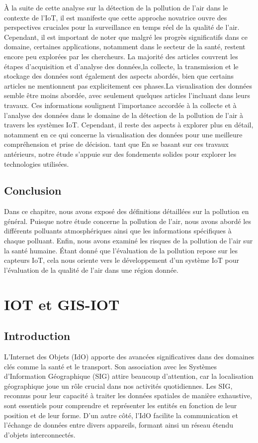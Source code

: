 \documentclass{report}
\begin{document}
À la suite de cette analyse sur la détection de la pollution de l'air dans le contexte de l'IoT, il est manifeste que cette approche novatrice ouvre des perspectives cruciales pour la surveillance en temps réel de la qualité de l'air. Cependant, il est important de noter que malgré les progrès significatifs dans ce domaine, certaines applications, notamment dans le secteur de la santé, restent encore peu explorées par les chercheurs.
La majorité des articles couvrent les étapes d'acquisition et d'analyse des données,la collecte, la transmission et le stockage des données sont également des aspects abordés, bien que certains articles ne mentionnent pas explicitement ces phases.La visualisation des données semble être moins abordée, avec seulement quelques articles l'incluant dans leurs travaux.
Ces informations soulignent l'importance accordée à la collecte et à l'analyse des données dans le domaine de la détection de la pollution de l'air à travers les systèmes IoT. Cependant, il reste des aspects à explorer plus en détail, notamment en ce qui concerne la visualisation des données pour une meilleure compréhension et prise de décision.
tant que 
En se basant sur ces travaux antérieurs, notre étude s'appuie sur des fondements solides pour explorer les technologies utilisées.

\section{Conclusion}
Dans ce chapitre, nous avons exposé des définitions détaillées sur la pollution en général. Puisque notre étude concerne la pollution de l'air, nous avons abordé les différents polluants atmosphériques ainsi que les informations spécifiques à chaque polluant. Enfin, nous avons examiné les risques de la pollution de l'air sur la santé humaine. Étant donné que l'évaluation de la pollution repose sur les capteurs IoT, cela nous oriente vers le développement d'un système IoT pour l'évaluation de la qualité de l'air dans une région donnée. 


\chapter{IOT et GIS-IOT}
\newpage
\section{Introduction}
L'Internet des Objets (IdO) apporte des avancées significatives dans des domaines clés comme la santé et le transport. Son association avec les Systèmes d'Information Géographique (SIG) attire beaucoup d'attention, car la localisation géographique joue un rôle crucial dans nos activités quotidiennes. Les SIG, reconnus pour leur capacité à traiter les données spatiales de manière exhaustive, sont essentiels pour comprendre et représenter les entités en fonction de leur position et de leur forme. D'un autre côté, l'IdO facilite la communication et l'échange de données entre divers appareils, formant ainsi un réseau étendu d'objets interconnectés.
\end{document}
